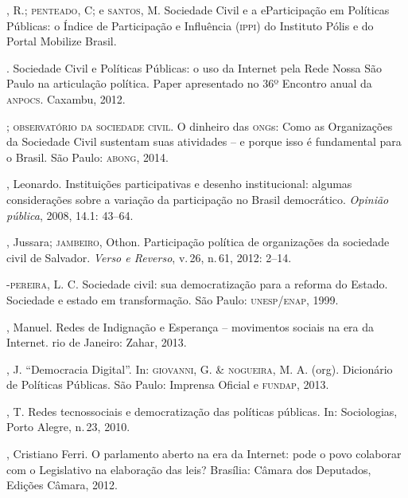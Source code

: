 \begin{bibliohedra}
, R.; \textsc{penteado}, C; e \textsc{santos}, M. Sociedade Civil e a eParticipação
em Políticas Públicas: o Índice de Participação e Influência (\textsc{ippi}) do
Instituto Pólis e do Portal Mobilize Brasil.

\titidem.
Sociedade Civil e Políticas Públicas: o uso da Internet pela Rede Nossa
São Paulo na articulação política. Paper apresentado no 36º Encontro
anual da \textsc{\textsc{anpocs}}. Caxambu, 2012.


; \textsc{observatório
da sociedade civil}. O dinheiro das \textsc{ong}s: Como as Organizações da
Sociedade Civil sustentam suas atividades -- e porque isso é fundamental
para o Brasil. São Paulo: \textsc{abong}, 2014.


, Leonardo. Instituições participativas e desenho institucional:
algumas considerações sobre a variação da participação no Brasil
democrático. \textit{Opinião pública}, 2008, 14.1: 43--64.

, Jussara; \textsc{jambeiro}, Othon. Participação política de organizações
da sociedade civil de Salvador. \textit{Verso e Reverso}, v.\,26, n.\,61,
2012: 2--14.

-\textsc{pereira}, L. C. Sociedade civil: sua democratização para a
reforma do Estado. Sociedade e estado em transformação. São Paulo:
\textsc{unesp}/\textsc{enap}, 1999.

, Manuel. Redes de Indignação e Esperança -- movimentos sociais
na era da Internet. rio de Janeiro: Zahar, 2013.

, J. ``Democracia Digital''. In: \textsc{giovanni}, G. \& \textsc{nogueira}, M. A.
(org). Dicionário de Políticas Públicas. São Paulo: Imprensa Oficial e
\textsc{fundap}, 2013.

, T. Redes tecnossociais e democratização das políticas públicas.
In: Sociologias, Porto Alegre, n.\,23, 2010.

, Cristiano Ferri. O parlamento aberto na era da Internet: pode o
povo colaborar com o Legislativo na elaboração das leis? Brasília:
Câmara dos Deputados, Edições Câmara, 2012.


\end{bibliohedra}
